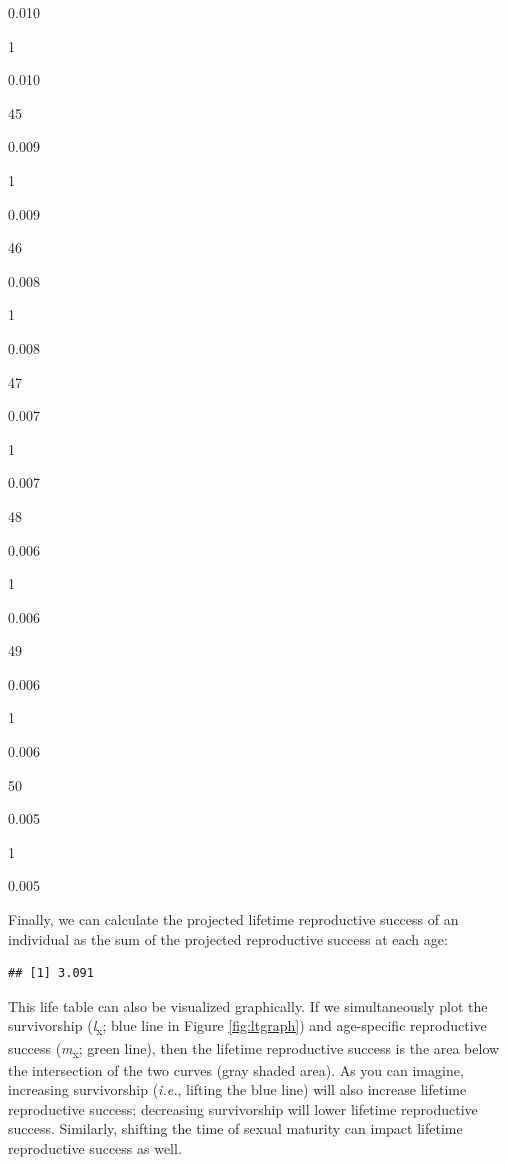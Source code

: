 \documentclass[
]{book}
\newenvironment{Shaded}{\begin{snugshade}}{\end{snugshade}}
\newcommand{\FunctionTok}[1]{\textcolor[rgb]{0.00,0.00,0.00}{#1}}
\newcommand{\NormalTok}[1]{#1}
\newcommand{\OtherTok}[1]{\textcolor[rgb]{0.56,0.35,0.01}{#1}}
\newcommand{\SpecialCharTok}[1]{\textcolor[rgb]{0.00,0.00,0.00}{#1}}
\begin{document}
0.010

1

0.010

45

0.009

1

0.009

46

0.008

1

0.008

47

0.007

1

0.007

48

0.006

1

0.006

49

0.006

1

0.006

50

0.005

1

0.005

Finally, we can calculate the projected lifetime reproductive success of an individual as the sum of the projected reproductive success at each age:

\begin{Shaded}
\end{Shaded}

\begin{verbatim}
## [1] 3.091
\end{verbatim}

This life table can also be visualized graphically. If we simultaneously plot the survivorship (\emph{l}\textsubscript{x}; blue line in Figure \ref{fig:ltgraph}) and age-specific reproductive success (\emph{m}\textsubscript{x}; green line), then the lifetime reproductive success is the area below the intersection of the two curves (gray shaded area). As you can imagine, increasing survivorship (\emph{i.e.}, lifting the blue line) will also increase lifetime reproductive success; decreasing survivorship will lower lifetime reproductive success. Similarly, shifting the time of sexual maturity can impact lifetime reproductive success as well.
\end{document}
